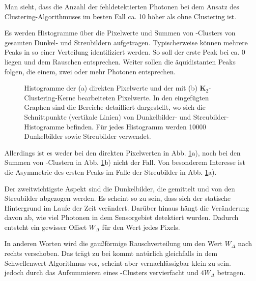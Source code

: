 \noindent
Man sieht, dass die Anzahl der fehldetektierten Photonen bei dem Ansatz des Clustering-Al\-go\-rith\-muses im besten Fall ca. 10 höher als ohne Clustering ist. 

\noindent
Es werden Histogramme über die Pixelwerte und Summen von -Clusters von gesamten Dunkel- und Streubildern aufgetragen. Typischerweise können mehrere Peaks in so einer Verteilung identifiziert werden. So soll der erste Peak bei ca. \SI{0}{\adu} liegen und dem Rauschen entsprechen. Weiter sollen die äquidistanten Peaks folgen, die einem, zwei oder mehr Photonen entsprechen.
\begin{figure}[H]
    \centering
    
    \caption{Histogramme der (a) direkten Pixelwerte und der mit (b) $\mathbf{K}_2$-Clustering-Kerne bearbeiteten Pixelwerte. In den eingefügten Graphen sind die Bereiche detailliert dargestellt, wo sich die Schnittpunkte (vertikale Linien) von Dunkelbilder- und Streubilder-Histogramme befinden. Für jedes Histogramm werden \num{10000} Dunkelbilder sowie Streubilder verwendet.}
    \label{fig:no_pr_cl_2_histograms}
\end{figure}
\noindent
Allerdings ist es weder bei den direkten Pixelwerten in Abb. \ref{fig:no_pr_cl_2_histograms}a), noch bei den Summen von -Clustern in Abb. \ref{fig:no_pr_cl_2_histograms}b) nicht der Fall. Von besonderem Interesse ist die Asymmetrie des ersten Peaks im Falle der Streubilder in Abb. \ref{fig:no_pr_cl_2_histograms}a).

\noindent
Der zweitwichtigste Aspekt sind die Dunkelbilder, die gemittelt und von den Streubilder abgezogen werden. Es scheint so zu sein, dass sich der statische Hintergrund im Laufe der Zeit verändert. Darüber hinaus hängt die Veränderung davon ab, wie viel Photonen in dem Sensorgebiet detektiert wurden. Dadurch entsteht ein gewisser Offset $W_\Delta$ für den Wert jedes Pixels.

\noindent
In anderen Worten wird die gaußförmige Rauschverteilung um den Wert $W_\Delta$ nach rechts verschoben. Das trägt zu bei kommt natürlich gleichfalls in dem Schwellenwert-Algorithmus vor, scheint aber vernachlässigbar klein zu sein.  jedoch durch das Aufsummieren eines -Clusters vervierfacht und $4W_\Delta$ betragen.

